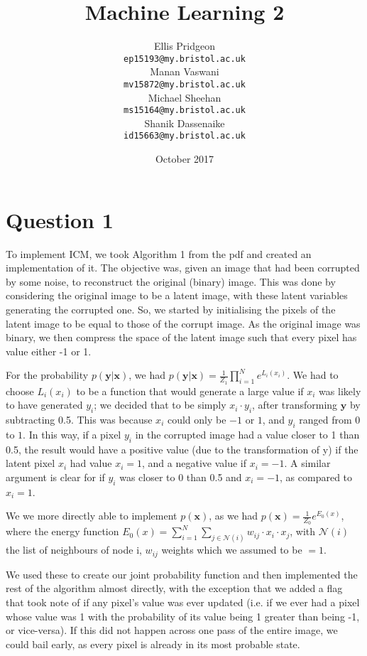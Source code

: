 \documentclass{article}
\date{October 2017}
\title{Machine Learning 2 }
\author{
Ellis Pridgeon \\
\texttt{ep15193@my.bristol.ac.uk} \\
\And
Manan Vaswani \\
\texttt{mv15872@my.bristol.ac.uk} \\
\AND
Michael Sheehan \\
\texttt{ms15164@my.bristol.ac.uk} \\
\And
Shanik Dassenaike \\
\texttt{id15663@my.bristol.ac.uk}
}
\begin{document}
\vspace*{-80pt}
\maketitle

\section*{Question 1}
To implement ICM, we took Algorithm 1 from the pdf and created an implementation of it. The objective was, given an image that had been corrupted by some noise, to reconstruct the original (binary) image. This was done by considering the original image to be a latent image, with these latent variables generating the corrupted one. So, we started by initialising the pixels of the latent image to be equal to those of the corrupt image. As the original image was binary, we then compress the space of the latent image such that every pixel has value either -1 or 1.

For the probability $p(\textbf{y}|\textbf{x})$, we had $p(\textbf{y}|\textbf{x}) = \frac{1}{Z_{1}} \prod_{i=1}^{N} e^{L_{i}(x_{i})}$. We had to choose $L_{i} (x_{i})$ to be a function that would generate a large value if $x_{i}$ was likely to have generated $y_{i}$; we decided that to be simply $x_{i} \cdot y_{i}$, after transforming $\textbf{y}$ by subtracting 0.5. This was because $x_{i}$ could only be $-1$ or $1$, and $y_{i}$ ranged from $0$ to $1$. In this way, if a pixel $y_{i}$ in the corrupted image had a value closer to 1 than 0.5, the result would have a positive value (due to the transformation of y) if the latent pixel $x_{i}$ had value $x_{i} = 1$, and a negative value if $x_{i} = -1$. A similar argument is clear for if $y_{i}$ was closer to 0 than 0.5 and $x_{i} = -1$, as compared to $x_{i} = 1$.

We we more directly able to implement $p(\textbf{x})$, as we had $p(\textbf{x}) = \frac{1}{Z_{0}} e^{E_{0}(x)}$, where the energy function $E_{0}(x) = \sum_{i=1}^{N} \sum_{j \in \mathcal{N}(i)} w_{ij} \cdot x_{i} \cdot x_{j}$, with $\mathcal{N}(i)$ the list of neighbours of node i, $w_{ij}$ weights which we assumed to be $= 1$.

We used these to create our joint probability function and then implemented the rest of the algorithm almost directly, with the exception that we added a flag that took note of if any pixel's value was ever updated (i.e. if we ever had a pixel whose value was 1 with the probability of its value being 1 greater than being -1, or vice-versa). If this did not happen across one pass of the entire image, we could bail early, as every pixel is already in its most probable state.
\end{document}
